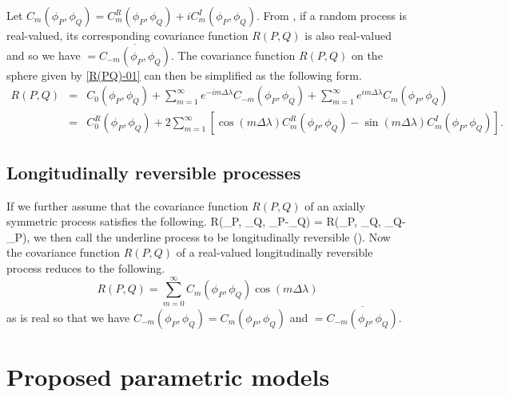 Let $C_m(\phi_P, \phi_Q) = C_m^R(\phi_P, \phi_Q) + i C_m^I(\phi_P, \phi_Q)$. From \cite{Huang2012}, if a random process is real-valued, its corresponding covariance function $R(P,Q)$ is also real-valued and so we have \Cm $= \overline{C_{-m}(\phi_P,\phi_Q)}$. The covariance function $R(P,Q)$ on the sphere given by \ref{R(PQ)-01} can then be simplified as the following form.
			\begin{eqnarray*}
				R(P,Q) &=& C_0(\phi_P,\phi_Q) + \sum_{m=1}^{\infty} e^{-im\Delta\lambda}C_{-m}(\phi_P,\phi_Q) +  \sum_{m=1}^{\infty} e^{im\Delta\lambda}C_m(\phi_P,\phi_Q) \\
				&=& C_{0}^{R}(\phi_P,\phi_Q)+2 \sum_{m=1}^{\infty}[\cos(m\Delta\lambda)C_{m}^{R}(\phi_P,\phi_Q)-\sin(m\Delta\lambda)C_{m}^{I}(\phi_P,\phi_Q)].
			\end{eqnarray*}
			
			
			\subsection{\bf Longitudinally reversible processes}
If we further assume that the covariance function $R(P, Q)$ of an axially symmetric process satisfies the following.
			\beq
			R(\phi_P, \phi_Q, \lambda_P-\lambda_Q) = R(\phi_P, \phi_Q, \lambda_Q-\lambda_P),
			\eeq
we then call the underline process to be longitudinally reversible (\cite{Stein2007}). Now the covariance function $R(P, Q)$ of a real-valued longitudinally reversible process reduces to the following.			
			\[
				R(P,Q) = \sum_{m=0}^{\infty} C_m(\phi_P,\phi_Q)\cos(m\Delta\lambda)
			\]
as \Cm is real so that we have $C_{-m}(\phi_P,\phi_Q)=C_m(\phi_P,\phi_Q)$  and \Cm $= \overline{C_{-m}(\phi_P,\phi_Q)}$.

				
			\section{Proposed parametric models}
					
